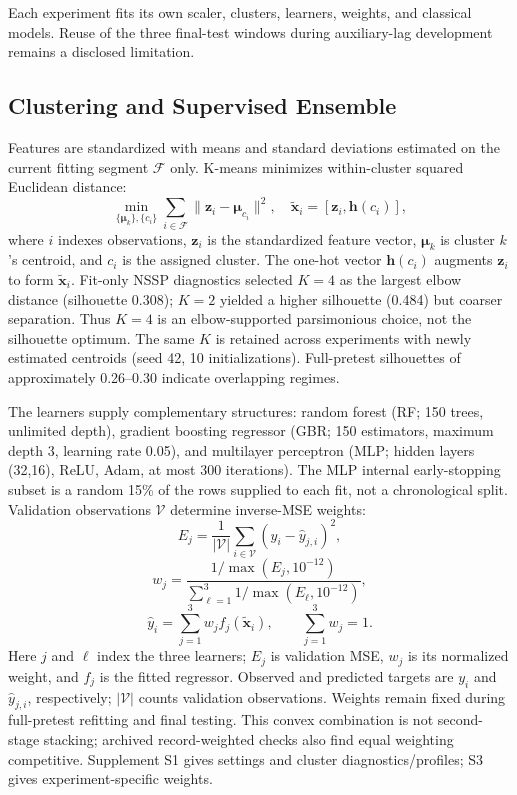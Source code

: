 \documentclass[conference,a4paper]{IEEEtran}
\begin{document}
Each experiment fits its own scaler, clusters, learners, weights, and classical models. Reuse of the three final-test windows during auxiliary-lag development remains a disclosed limitation.

\subsection{Clustering and Supervised Ensemble}
Features are standardized with means and standard deviations estimated on the current fitting segment $\mathcal F$ only. K-means \cite{macqueen} minimizes within-cluster squared Euclidean distance:
\begin{equation}
\min_{\{\boldsymbol\mu_k\},\{c_i\}}\sum_{i\in\mathcal F}\|\boldsymbol z_i-\boldsymbol\mu_{c_i}\|^2,
\quad \tilde{\boldsymbol x}_i=[\boldsymbol z_i,\boldsymbol h(c_i)],
\label{eq:k}
\end{equation}
where $i$ indexes observations, $\boldsymbol z_i$ is the standardized feature vector, $\boldsymbol\mu_k$ is cluster $k$'s centroid, and $c_i$ is the assigned cluster. The one-hot vector $\boldsymbol h(c_i)$ augments $\boldsymbol z_i$ to form $\tilde{\boldsymbol x}_i$. Fit-only NSSP diagnostics selected $K=4$ as the largest elbow distance (silhouette 0.308); $K=2$ yielded a higher silhouette (0.484) but coarser separation. Thus $K=4$ is an elbow-supported parsimonious choice, not the silhouette optimum. The same $K$ is retained across experiments with newly estimated centroids (seed 42, 10 initializations). Full-pretest silhouettes of approximately 0.26--0.30 indicate overlapping regimes.

The learners supply complementary structures: random forest (RF; 150 trees, unlimited depth), gradient boosting regressor (GBR; 150 estimators, maximum depth 3, learning rate 0.05), and multilayer perceptron (MLP; hidden layers (32,16), ReLU, Adam, at most 300 iterations). The MLP internal early-stopping subset is a random 15\% of the rows supplied to each fit, not a chronological split. Validation observations $\mathcal V$ determine inverse-MSE weights:
\begin{equation}
E_j=\frac{1}{|\mathcal V|}\sum_{i\in\mathcal V}(y_i-\hat y_{j,i})^2,
\end{equation}
\begin{equation}
w_j=\frac{1/\max(E_j,10^{-12})}{\sum_{\ell=1}^{3}1/\max(E_\ell,10^{-12})},
\label{eq:weights}
\end{equation}
\begin{equation}
\hat y_i=\sum_{j=1}^{3}w_jf_j(\tilde{\boldsymbol x}_i),\qquad \sum_{j=1}^{3}w_j=1.
\label{eq:hybrid}
\end{equation}
Here $j$ and $\ell$ index the three learners; $E_j$ is validation MSE, $w_j$ is its normalized weight, and $f_j$ is the fitted regressor. Observed and predicted targets are $y_i$ and $\hat y_{j,i}$, respectively; $|\mathcal V|$ counts validation observations. Weights remain fixed during full-pretest refitting and final testing. This convex combination is not second-stage stacking; archived record-weighted checks also find equal weighting competitive. Supplement S1 gives settings and cluster diagnostics/profiles; S3 gives experiment-specific weights.
\end{document}
